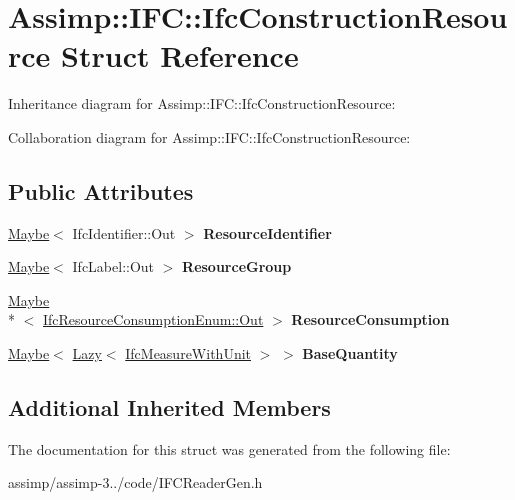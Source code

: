 \hypertarget{struct_assimp_1_1_i_f_c_1_1_ifc_construction_resource}{\section{Assimp\+:\+:I\+F\+C\+:\+:Ifc\+Construction\+Resource Struct Reference}
\label{struct_assimp_1_1_i_f_c_1_1_ifc_construction_resource}
}


Inheritance diagram for Assimp\+:\+:I\+F\+C\+:\+:Ifc\+Construction\+Resource\+:


Collaboration diagram for Assimp\+:\+:I\+F\+C\+:\+:Ifc\+Construction\+Resource\+:
\subsection*{Public Attributes}
\begin{DoxyCompactItemize}
\item 
\hypertarget{struct_assimp_1_1_i_f_c_1_1_ifc_construction_resource_a7e6212c3e77013298c80d57473ddc4fb}{\hyperlink{struct_assimp_1_1_s_t_e_p_1_1_maybe}{Maybe}$<$ Ifc\+Identifier\+::\+Out $>$ {\bfseries Resource\+Identifier}}\label{struct_assimp_1_1_i_f_c_1_1_ifc_construction_resource_a7e6212c3e77013298c80d57473ddc4fb}

\item 
\hypertarget{struct_assimp_1_1_i_f_c_1_1_ifc_construction_resource_a6a5f811aea8434e000d4a6e427a0bde6}{\hyperlink{struct_assimp_1_1_s_t_e_p_1_1_maybe}{Maybe}$<$ Ifc\+Label\+::\+Out $>$ {\bfseries Resource\+Group}}\label{struct_assimp_1_1_i_f_c_1_1_ifc_construction_resource_a6a5f811aea8434e000d4a6e427a0bde6}

\item 
\hypertarget{struct_assimp_1_1_i_f_c_1_1_ifc_construction_resource_acfaaad3d68351d93ece3d05ff09a9ec2}{\hyperlink{struct_assimp_1_1_s_t_e_p_1_1_maybe}{Maybe}\\*
$<$ \hyperlink{classboost_1_1shared__ptr}{Ifc\+Resource\+Consumption\+Enum\+::\+Out} $>$ {\bfseries Resource\+Consumption}}\label{struct_assimp_1_1_i_f_c_1_1_ifc_construction_resource_acfaaad3d68351d93ece3d05ff09a9ec2}

\item 
\hypertarget{struct_assimp_1_1_i_f_c_1_1_ifc_construction_resource_a458f0569b32232188cf1d234438759f2}{\hyperlink{struct_assimp_1_1_s_t_e_p_1_1_maybe}{Maybe}$<$ \hyperlink{struct_assimp_1_1_s_t_e_p_1_1_lazy}{Lazy}$<$ \hyperlink{struct_assimp_1_1_i_f_c_1_1_ifc_measure_with_unit}{Ifc\+Measure\+With\+Unit} $>$ $>$ {\bfseries Base\+Quantity}}\label{struct_assimp_1_1_i_f_c_1_1_ifc_construction_resource_a458f0569b32232188cf1d234438759f2}

\end{DoxyCompactItemize}
\subsection*{Additional Inherited Members}


The documentation for this struct was generated from the following file\+:\begin{DoxyCompactItemize}
\item 
assimp/assimp-\/3../code/I\+F\+C\+Reader\+Gen.\+h\end{DoxyCompactItemize}
